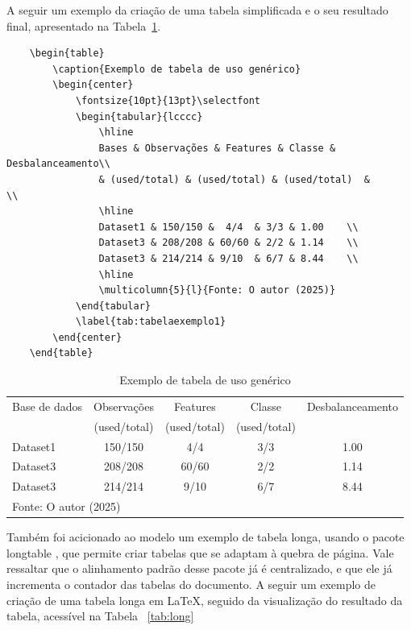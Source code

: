 \begin{enumerate}
	A seguir um exemplo da criação de uma tabela simplificada e o seu resultado final, apresentado na Tabela~\ref{tab:tabelaexemplo1}.

	\begin{verbatim}
	\begin{table}
		\caption{Exemplo de tabela de uso genérico}
		\begin{center}
			\fontsize{10pt}{13pt}\selectfont
			\begin{tabular}{lcccc}
				\hline
				Bases & Observações & Features & Classe & Desbalanceamento\\
				& (used/total) & (used/total) & (used/total)  &           \\
				\hline
				Dataset1 & 150/150 &  4/4  & 3/3 & 1.00    \\
				Dataset3 & 208/208 & 60/60 & 2/2 & 1.14    \\
				Dataset3 & 214/214 & 9/10  & 6/7 & 8.44    \\
				\hline
				\multicolumn{5}{l}{Fonte: O autor (2025)}
			\end{tabular}
			\label{tab:tabelaexemplo1}
		\end{center}
	\end{table}
	\end{verbatim}
	
	\begin{table}[H]
		\caption{Exemplo de tabela de uso genérico}
		\begin{center}
			\fontsize{10pt}{13pt}\selectfont
			\begin{tabular}{lcccc}
				\hline
				Base de dados & Observações  &   Features   &   Classe  & Desbalanceamento\\
				& (used/total) & (used/total) & (used/total)  &                  \\
				\hline
				Dataset1 &   150/150    &     4/4      &     3/3       & 1.00    \\
				Dataset3 &   208/208    &    60/60     &     2/2       & 1.14    \\
				Dataset3 &   214/214    &     9/10     &     6/7       & 8.44    \\
				\hline
				\multicolumn{5}{l}{Fonte: O autor (2025)}
			\end{tabular}
			\label{tab:tabelaexemplo1}
		\end{center}
	\end{table}

	Também foi acicionado ao modelo um exemplo de tabela longa, usando o pacote longtable \cite{longtable_package}, que permite criar tabelas que se adaptam à quebra de página. Vale ressaltar que o alinhamento padrão desse pacote já é centralizado, e que ele já incrementa o contador das tabelas do documento. A seguir um exemplo de criação de uma tabela longa em \LaTeX, seguido da visualização do resultado da tabela, acessível na Tabela ~\ref{tab:long}
	

\end{enumerate}
